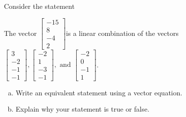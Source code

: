 
\begin{exerciseStatement}


Consider the statement 
\begin{center}\begin{minipage}{0.8\textwidth}
 The vector \( \left[\begin{array}{c}
-15 \\
8 \\
-4 \\
2
\end{array}\right] \)is a linear combination of the vectors \( \left[\begin{array}{c}
3 \\
-2 \\
-1 \\
-1
\end{array}\right] , \left[\begin{array}{c}
-2 \\
1 \\
-3 \\
-1
\end{array}\right] , \text{ and } \left[\begin{array}{c}
-2 \\
0 \\
-1 \\
1
\end{array}\right] \). 
\end{minipage}\end{center}
    


\begin{enumerate}[(a)]
\item  Write an equivalent statement using a vector equation.
\item  Explain why your statement is true or false.
\end{enumerate}
    
\end{exerciseStatement}
    
